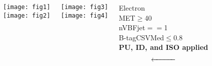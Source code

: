 \begin{frame}
\begin{columns}[T]
			\centering
			\texttt{[image: fig1]}\\
			\texttt{[image: fig2]}

			\centering
			\texttt{[image: fig3]}\\
			\texttt{[image: fig4]}

			\centering
			\tiny{
			Electron\\MET$\ge$40\\nVBFjet$==$1\\B-tagCSVMed$\le 0.8$\\{\bf PU, ID, and ISO applied}}\\
			\[ \xleftarrow{\hspace*{1cm}} \]
			\tiny{
}
\end{columns}
\end{frame}
